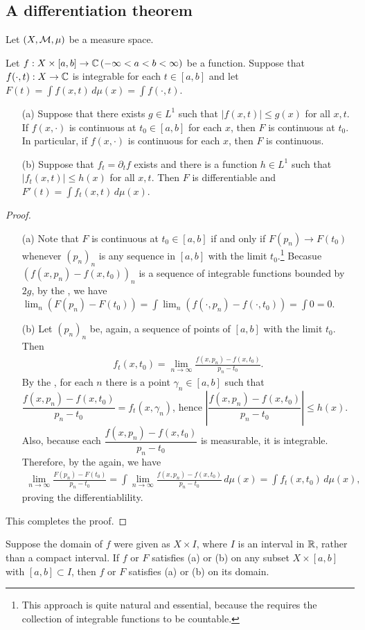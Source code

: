 \subsection{A differentiation theorem}
Let $(X, {\mathcal{M}}, \mu)$ be a measure space.
\begin{thm}
    Let $f: X\times[a, b]\rightarrow{\mathbb{C}}\,(-\infty<a<b<\infty)$ be a function.
    Suppose that $f(\cdot, t): X\rightarrow{\mathbb{C}}$ is integrable for each $t\in[a, b]$ and let $F(t)=\int f(x, t)\,d\mu(x)=\int f(\cdot, t)$.
    \begin{enumerate}
        \item[(a)]
        {
            Suppose that there exists $g\in L^1$ such that $|f(x, t)|\leq g(x)$ for all $x, t$.
            If $f(x, \cdot)$ is continuous at $t_0\in[a, b]$ for each $x$, then $F$ is continuous at $t_0$.
            In particular, if $f(x, \cdot)$ is continuous for each $x$, then $F$ is continuous.
        }
        \item[(b)]
        {
            Suppose that $f_t=\partial_t f$ exists and there is a function $h\in L^1$ such that $|f_t(x, t)|\leq h(x)$ for all $x, t$.
            Then $F$ is differentiable and $F'(t)=\int f_t(x, t)\,d\mu(x)$.
        }
    \end{enumerate}
\end{thm}
\begin{proof}
    \begin{enumerate}
        \item[(a)]
        {
            Note that $F$ is continuous at $t_0\in[a, b]$ if and only if $F(p_n)\rightarrow F(t_0)$ whenever $(p_n)_n$ is any sequence in $[a, b]$ with the limit $t_0$.\footnote{This approach is quite natural and essential, because the \ldct requires the collection of integrable functions to be countable.}
            Becasue $(f(x, p_n)-f(x, t_0))_n$ is a sequence of integrable functions bounded by $2g$, by the \ldct, we have $\lim_n(F(p_n)-F(t_0))=\int\lim_n(f(\cdot, p_n)-f(\cdot, t_0))=\int 0=0$.
        }
        \item[(b)]
        {
            Let $(p_n)_n$ be, again, a sequence of points of $[a, b]$ with the limit $t_0$.
            Then
            \begin{align*}
                f_t(x, t_0)=\lim_{n\rightarrow\infty}\frac{f(x, p_n)-f(x, t_0)}{p_n-t_0}.
            \end{align*}
            By the \mvt, for each $n$ there is a point $\gamma_n\in[a, b]$ such that $\dfrac{f(x, p_n)-f(x, t_0)}{p_n-t_0}=f_t(x, \gamma_n)$, hence $\left|\dfrac{f(x, p_n)-f(x, t_0)}{p_n-t_0}\right|\leq h(x)$.
            Also, because each $\dfrac{f(x, p_n)-f(x, t_0)}{p_n-t_0}$ is measurable, it is integrable.
            Therefore, by the \ldct again, we have
            \begin{align*}
                \lim_{n\rightarrow\infty}\frac{F(p_n)-F(t_0)}{p_n-t_0}=\int\lim_{n\rightarrow\infty}\frac{f(x, p_n)-f(x, t_0)}{p_n-t_0}\,d\mu(x)=\int f_t(x, t_0)\,d\mu(x),
            \end{align*}
            proving the differentiablility.
        }
    \end{enumerate}
    This completes the proof.
\end{proof}
\begin{rmk}
    Suppose the domain of $f$ were given as $X\times I$, where $I$ is an interval in ${\mathbb{R}}$, rather than a compact interval.
    If $f$ or $F$ satisfies (a) or (b) on any subset $X\times [a, b]$ with $[a, b]\subset I$, then $f$ or $F$ satisfies (a) or (b) on its domain.
\end{rmk}